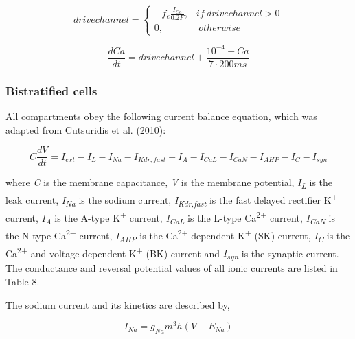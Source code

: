 \documentclass[a4paper]{article}
\begin{document}
\begin{equation}
drivechannel = \begin{cases} -f_e \frac{I_{Ca}}{0.2 F}, & if \ drivechannel > 0  \\ 0, & \  otherwise \ \end{cases}
\end{equation}

\begin{equation}
\frac{dCa}{dt}=drivechannel +\frac{10^{-4}-Ca}{7\cdot 200 ms}
\end{equation}




\bigskip

\subsubsection{Bistratified cells}

All compartments obey the following current balance equation, which was adapted from Cutsuridis et al. (2010):


\begin{equation}
C\frac{dV}{dt}=I_{ext}-I_L-I_{Na}-I_{Kdr, fast}-I_A-I_{CaL}-I_{CaN}-I_{AHP}-I_C-I_{syn}
\end{equation}


where \textit{C} is the membrane capacitance, \textit{V} is the membrane potential, \textit{I}\textit{\textsubscript{L}}
is the leak current, \textit{I}\textit{\textsubscript{Na}} is the sodium current,
\textit{I}\textit{\textsubscript{Kdr,fast}} is the fast delayed rectifier K\textsuperscript{+} current,
\textit{I}\textit{\textsubscript{A}} is the A-type K\textsuperscript{+} current, \textit{I}\textit{\textsubscript{CaL}}
is the L-type Ca\textsuperscript{2+} current, \textit{I}\textit{\textsubscript{CaN}} is the N-type
Ca\textsuperscript{2+} current, \textit{I}\textit{\textsubscript{AHP}} is the Ca\textsuperscript{2+}-dependent
K\textsuperscript{+} (SK) current, \textit{I}\textit{\textsubscript{C}} is the Ca\textsuperscript{2+} and
voltage-dependent K\textsuperscript{+} (BK) current and \textit{I}\textit{\textsubscript{syn}} is the synaptic current.
The conductance and reversal potential values of all ionic currents are listed in Table 8. \ \ 



The sodium current and its kinetics are described by,


\begin{equation}
I_{Na}=g_{Na} m^3 h (V-E_{Na})
\end{equation}
\end{document}

